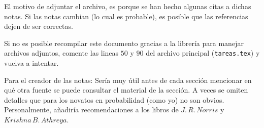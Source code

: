 \documentclass[a5paper,oneside]{amsart}
\theoremstyle{definition}
\numberwithin{section}{part}
\numberwithin{equation}{subsection}
\begin{document}
        El motivo de adjuntar el archivo, es porque se han hecho algunas citas a dichas notas. Si las notas cambian (lo cual es probable), 
        es posible que las referencias dejen de ser correctas.\pn
        
        Si no es posible recompilar este documento gracias a la librería para manejar archivos adjuntos, comente las lineas $50$ y $90$ del archivo 
        principal (\texttt{tareas.tex}) y vuelva a intentar.\pn
        
        Para el creador de las notas: Sería muy útil antes de cada sección mencionar en qué otra fuente se puede consultar el material de
        la sección. A veces se omiten detalles que para los novatos en probabilidad (como yo) no son obvios. Personalmente, añadiría recomendaciones 
        a los libros de $J.\,R.\,Norris$ y $Krishna\,B.\,Athreya$.
\end{document}
